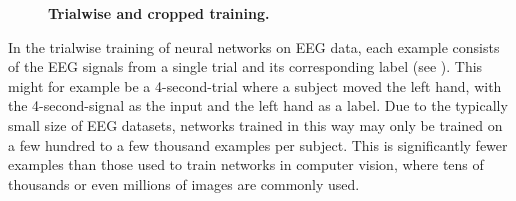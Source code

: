 \begin{figure}[bth]
    \myfloatalign
     \quad
    \caption[Trialwise and cropped training]{\textbf{Trialwise and cropped training.}}\label{cropped-and-trialwise-figure}
\end{figure}


In the trialwise training of neural networks on EEG data, each example
consists of the EEG signals from a single trial and its corresponding
label (see ). This might for example be a 4-second-trial where a subject moved
the left hand, with the 4-second-signal as the input and the left hand
as a label. Due to the typically small size of EEG datasets, networks
trained in this way may only be trained on a few hundred to a few
thousand examples per subject. This is significantly fewer examples than
those used to train networks in computer vision, where tens of thousands
or even millions of images are commonly used.


